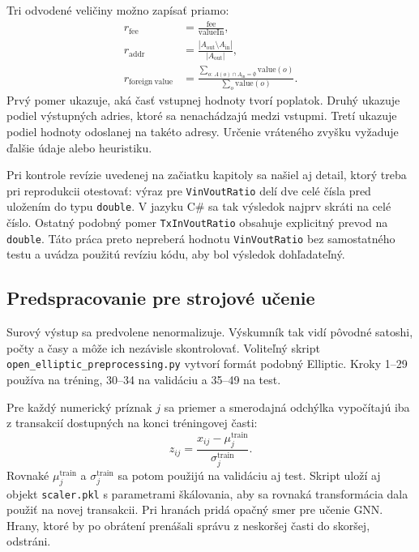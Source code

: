 Tri odvodené veličiny možno zapísať priamo:
\begin{align}
  r_{\mathrm{fee}} &= \frac{\mathrm{fee}}{\mathrm{valueIn}},\\
  r_{\mathrm{addr}} &=
  \frac{|A_{\mathrm{out}}\setminus A_{\mathrm{in}}|}{|A_{\mathrm{out}}|},\\
  r_{\mathrm{foreign\ value}} &=
  \frac{\sum_{o:\,A(o)\cap A_{\mathrm{in}}=\emptyset}\mathrm{value}(o)}
  {\sum_o\mathrm{value}(o)}.
  \label{eq:open-elliptic-ratios}
\end{align}
Prvý pomer ukazuje, aká časť vstupnej hodnoty tvorí poplatok. Druhý
ukazuje podiel výstupných adries, ktoré sa nenachádzajú medzi vstupmi.
Tretí ukazuje podiel hodnoty odoslanej na takéto adresy. Určenie
vráteného zvyšku vyžaduje ďalšie údaje alebo heuristiku.

Pri kontrole revízie uvedenej na začiatku kapitoly sa našiel aj detail,
ktorý treba pri reprodukcii otestovať: výraz pre
\texttt{VinVoutRatio} delí dve celé čísla pred uložením do typu
\texttt{double}. V jazyku C\# sa tak výsledok najprv skráti na celé
číslo. Ostatný podobný pomer \texttt{TxInVoutRatio} obsahuje explicitný
prevod na \texttt{double}. Táto práca preto nepreberá hodnotu
\texttt{VinVoutRatio} bez samostatného testu a uvádza použitú revíziu
kódu, aby bol výsledok dohľadateľný.

\subsection{Predspracovanie pre strojové učenie}

Surový výstup sa predvolene nenormalizuje. Výskumník tak vidí pôvodné
satoshi, počty a časy a môže ich nezávisle skontrolovať. Voliteľný
skript \texttt{open\_\allowbreak{}elliptic\_\allowbreak{}preprocessing.py}
vytvorí formát podobný Elliptic. Kroky 1--29 používa na tréning, 30--34
na validáciu a 35--49 na test.

Pre každý numerický príznak $j$ sa priemer a smerodajná odchýlka
vypočítajú iba z transakcií dostupných na konci tréningovej časti:
\begin{equation}
  z_{ij}=\frac{x_{ij}-\mu_j^{\mathrm{train}}}
  {\sigma_j^{\mathrm{train}}}.
  \label{eq:safar-train-scaling}
\end{equation}
Rovnaké $\mu_j^{\mathrm{train}}$ a $\sigma_j^{\mathrm{train}}$ sa potom
použijú na validáciu aj test. Skript uloží aj objekt
\texttt{scaler.pkl} s parametrami škálovania, aby sa rovnaká transformácia dala použiť na novej
transakcii. Pri hranách pridá opačný smer pre učenie GNN. Hrany, ktoré
by po obrátení prenášali správu z neskoršej časti do skoršej, odstráni.

